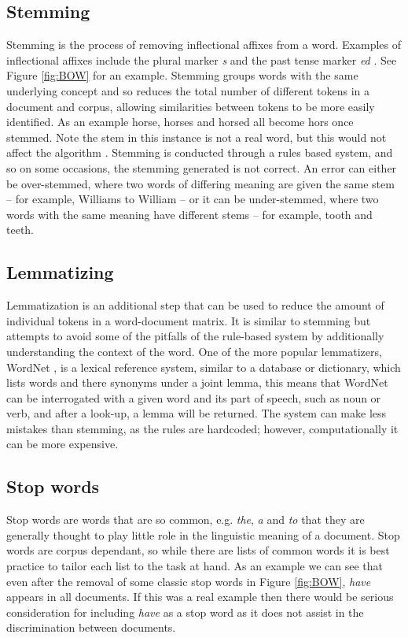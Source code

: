 \subsection{Stemming} Stemming is the process of removing inflectional affixes from a word. Examples of inflectional affixes include the plural marker \emph{s} and the past tense marker \emph{ed} \parencite{eisenstein2018natural}. See Figure \ref{fig:BOW} for an example. Stemming groups words with the same underlying concept and so reduces the total number of different tokens in a document and corpus, allowing similarities between tokens to be more easily identified. As an example horse, horses and horsed all become hors once stemmed. Note the stem in this instance is not a real word, but this would not affect the algorithm \parencite{jivani2011comparative}. Stemming is conducted through a rules based system, and so on some occasions, the stemming generated is not correct.  An error can either be over-stemmed, where two words of differing meaning are given the same stem – for example, Williams to William – or it can be under-stemmed, where two words with the same meaning have different stems – for example, tooth and teeth.

\subsection{Lemmatizing} Lemmatization is an additional step that can be used to reduce the amount of individual tokens in a word-document matrix. It is similar to stemming but attempts to avoid some of the pitfalls of the rule-based system by additionally understanding the context of the word. One of the more popular lemmatizers, WordNet \parencite{MillerGeorgeA1990ItWA}, is a lexical reference system, similar to a database or dictionary, which lists words and there synonyms under a joint lemma, this means that WordNet can be interrogated with a given word and its part of speech, such as noun or verb, and after a look-up, a lemma will be returned. The system can make less mistakes than stemming, as the rules are hardcoded; however, computationally it can be more expensive.

\subsection{Stop words} Stop words are words that are so common, e.g. \emph{the}, \emph{a} and \emph{to} that they are generally thought to play little role in the linguistic meaning of a document. Stop words are corpus dependant, so while there are lists of common words it is best practice to tailor each list to the task at hand. As an example we can see that even after the removal of some classic stop words in Figure \ref{fig:BOW}, \emph{have} appears in all documents. If this was a real example then there would be serious consideration for including \emph{have} as a stop word as it does not assist in the discrimination between documents. 


